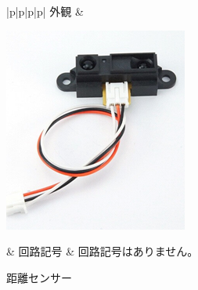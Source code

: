 \begin{figure}[H]
	\begin{widerrows}
		\begin{tabular}{|p{\colH}|p{\colI}|p{\colH}|p{\colI}|} \hline
		外観 & 
		\begin{minipage}[t]{\linewidth}
			\smallskip
				\centering
				\includegraphics[width=0.5\linewidth]{images/chap05/text05-img031.png}
				\caption{距離センサー}
				\smallskip
			\end{minipage} &
			回路記号 & 回路記号はありません。\\ \hline
		\end{tabular}
  \end{widerrows}	
\end{figure}